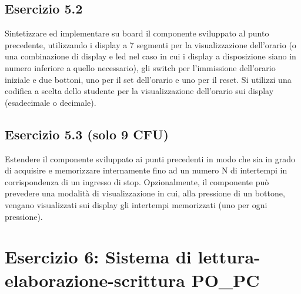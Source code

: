 \implementazione
{}

\simulazione
{}

\subsection{Esercizio 5.2}

\begin{traccia}
	Sintetizzare ed implementare su board il componente sviluppato al punto precedente,
	utilizzando i display a 7 segmenti per la visualizzazione dell'orario (o una combinazione
	di display e led nel caso in cui i display a disposizione siano in numero inferiore a
	quello necessario), gli switch per l'immissione dell'orario iniziale e due bottoni, uno per
	il set dell'orario e uno per il reset. Si utilizzi una codifica a scelta dello studente per
	la visualizzazione dell'orario sui display (esadecimale o decimale).
\end{traccia}

\sintesiboard
{}

\subsection{Esercizio 5.3 (solo 9 CFU)}

\begin{traccia}
	Estendere il componente sviluppato ai punti precedenti in modo che sia in grado di
	acquisire e memorizzare internamente fino ad un numero N di intertempi in corrispondenza di
	un ingresso di stop. Opzionalmente, il componente può prevedere una modalità di
	visualizzazione in cui, alla pressione di un bottone, vengano visualizzati sui display gli
	intertempi memorizzati (uno per ogni pressione).
\end{traccia}


\section{Esercizio 6: Sistema di lettura-elaborazione-scrittura PO\_PC}

